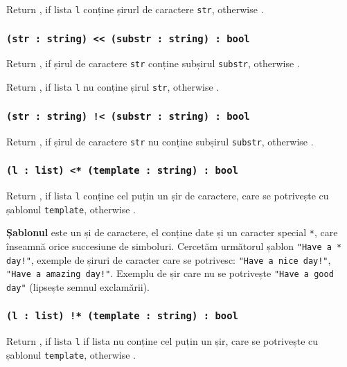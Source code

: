 Return \true{}, if lista \texttt{l} conține șirurl de caractere \texttt{str}, otherwise \false{}.

\subsubsection{\texttt{(str : string) << (substr : string) : bool}}

Return \true{}, if șirul de caractere \texttt{str} conține subșirul \texttt{substr}, otherwise \false{}.

Return \true{}, if lista \texttt{l} nu conține șirul \texttt{str}, otherwise \false{}.

\subsubsection{\texttt{(str : string) !< (substr : string) : bool}}

Return \true{}, if șirul de caractere \texttt{str} nu conține subșirul \texttt{substr}, otherwise \false{}.

\subsubsection{\texttt{(l : list) <* (template : string) : bool}}

Return \true{}, if lista \texttt{l} conține cel puțin un șir de caractere, care se potrivește cu șablonul \texttt{template}, otherwise \false{}.

{\bf Șablonul} este un și de caractere, el conține date și un caracter special \texttt{*}, care înseamnă orice succesiune de simboluri. Cercetăm următorul șablon \texttt{"Have a * day!"}, exemple de șiruri de caracter care se potrivesc: \texttt{"Have a nice day!"}, \texttt{"Have a amazing day!"}. Exemplu de șir care nu se potrivește \texttt{"Have a good day"} (lipsește semnul exclamării).

\subsubsection{\texttt{(l : list) !* (template : string) : bool}}

Return \true{}, if lista \texttt{l} if lista nu conține cel puțin un șir, care se potrivește cu șablonul \texttt{template}, otherwise \false{}.

